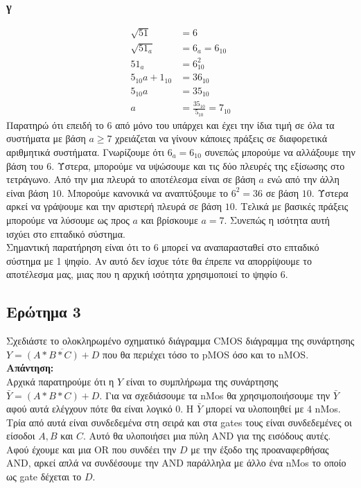 \documentclass[draft]{article}
\begin{document}
\subsubsection{γ}
\begin{align*}
  \sqrt{51} &= 6 \\
  \sqrt{51_a} &= 6_a = 6_{10} \\
  51_a &= 6_{10}^2 \\
  5_{10}a + 1_{10} &= 36_{10} \\
  5_{10}a &= 35_{10} \\
  a &= \frac{35_{10}}{5_{10}} = 7_{10}
\end{align*}
Παρατηρώ ότι επειδή το $6$ από μόνο του υπάρχει και έχει την ίδια τιμή σε όλα τα συστήματα με βάση $a \ge 7$ χρειάζεται να γίνουν κάποιες πράξεις σε διαφορετικά αριθμητικά συστήματα.
Γνωρίζουμε ότι $6_a = 6_{10}$ συνεπώς μπορούμε να αλλάξουμε την βάση του $6$. Ύστερα, μπορούμε να υψώσουμε και τις δύο πλευρές της εξίσωσης στο τετράγωνο. Από την μια πλευρά το αποτέλεσμα είναι σε βάση $a$ ενώ από την άλλη είναι βάση $10$.
Μπορούμε κανονικά να αναπτύξουμε το $6^2 = 36$ σε βάση $10$. Ύστερα αρκεί να γράψουμε και την αριστερή πλευρά σε βάση $10$. Τελικά με βασικές πράξεις μπορούμε να λύσουμε ως προς $a$ και βρίσκουμε $a = 7$.
Συνεπώς η ισότητα αυτή ισχύει στο επταδικό σύστημα. \\ 
Σημαντική παρατήρηση είναι ότι το $6$ μπορεί να αναπαρασταθεί στο επταδικό σύστημα με 1 ψηφίο. Αν αυτό δεν ίσχυε τότε θα έπρεπε να απορρίψουμε το αποτέλεσμα μας, μιας που η αρχική ισότητα χρησιμοποιεί το ψηφίο $6$.

\newpage

\subsection{Ερώτημα 3}
Σχεδιάστε το ολοκληρωμένο σχηματικό διάγραμμα CMOS διάγραμμα της συνάρτησης $Y=\overline{(A * B * C) + D}$ που θα περιέχει τόσο το pMOS όσο και το nMOS.\\
\textbf{Απάντηση: } \\

Αρχικά παρατηρούμε ότι η $Y$ είναι το συμπλήρωμα της συνάρτησης $\bar{Y} = (A * B * C) + D$.
Για να σχεδιάσουμε τα nMos θα χρησιμοποιήσουμε την $\bar{Y}$ αφού αυτά ελέγχουν πότε θα είναι λογικό 0.
Η $\bar{Y}$ μπορεί να υλοποιηθεί με 4 nMos. Τρία από αυτά είναι συνδεδεμένα στη σειρά και στα gates τους είναι συνδεδεμένες οι είσοδοι $A, B$ και $C$.
Αυτό θα υλοποιήσει μια πύλη AND για της εισόδους αυτές. Αφού έχουμε και μια OR που συνδέει την $D$ με την έξοδο της προαναφερθήσας AND,
αρκεί απλά να συνδέσουμε την AND παράλληλα με άλλο ένα nMos το οποίο ως gate δέχεται το $D$.
\end{document}
